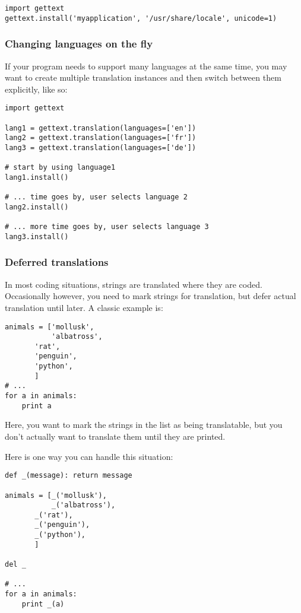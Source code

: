 \begin{verbatim}
import gettext
gettext.install('myapplication', '/usr/share/locale', unicode=1)
\end{verbatim}

\subsubsection{Changing languages on the fly}

If your program needs to support many languages at the same time, you
may want to create multiple translation instances and then switch
between them explicitly, like so:

\begin{verbatim}
import gettext

lang1 = gettext.translation(languages=['en'])
lang2 = gettext.translation(languages=['fr'])
lang3 = gettext.translation(languages=['de'])

# start by using language1
lang1.install()

# ... time goes by, user selects language 2
lang2.install()

# ... more time goes by, user selects language 3
lang3.install()
\end{verbatim}

\subsubsection{Deferred translations}

In most coding situations, strings are translated where they are coded.
Occasionally however, you need to mark strings for translation, but
defer actual translation until later.  A classic example is:

\begin{verbatim}
animals = ['mollusk',
           'albatross',
	   'rat',
	   'penguin',
	   'python',
	   ]
# ...
for a in animals:
    print a
\end{verbatim}

Here, you want to mark the strings in the  list as being
translatable, but you don't actually want to translate them until they
are printed.

Here is one way you can handle this situation:

\begin{verbatim}
def _(message): return message

animals = [_('mollusk'),
           _('albatross'),
	   _('rat'),
	   _('penguin'),
	   _('python'),
	   ]

del _

# ...
for a in animals:
    print _(a)
\end{verbatim}

